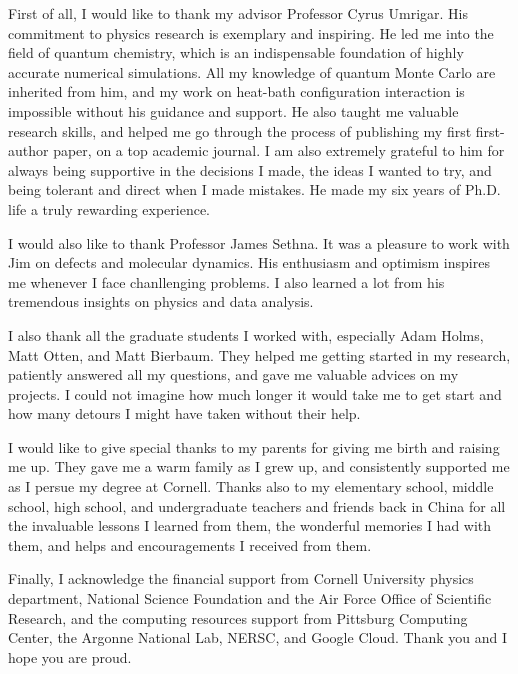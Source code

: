 \documentclass[phd,tocprelim]{cornell}
\begin{document}
\begin{acknowledgements}
First of all, I would like to thank my advisor Professor Cyrus Umrigar.
His commitment to physics research is exemplary and inspiring.
He led me into the field of quantum chemistry, which is an indispensable foundation of highly accurate numerical simulations.
All my knowledge of quantum Monte Carlo are inherited from him, and my work on heat-bath configuration interaction is impossible without his guidance and support.
He also taught me valuable research skills, and helped me go through the process of publishing my first first-author paper, on a top academic journal.
I am also extremely grateful to him for always being supportive in the decisions I made, the ideas I wanted to try, and being tolerant and direct when I made mistakes.
He made my six years of Ph.D. life a truly rewarding experience.

I would also like to thank Professor James Sethna.
It was a pleasure to work with Jim on defects and molecular dynamics.
His enthusiasm and optimism inspires me whenever I face chanllenging problems.
I also learned a lot from his tremendous insights on physics and data analysis.

I also thank all the graduate students I worked with, especially Adam Holms, Matt Otten, and Matt Bierbaum.
They helped me getting started in my research, patiently answered all my questions, and gave me valuable advices on my projects.
I could not imagine how much longer it would take me to get start and how many detours I might have taken without their help.

I would like to give special thanks to my parents for giving me birth and raising me up.
They gave me a warm family as I grew up, and consistently supported me as I persue my degree at Cornell.
Thanks also to my elementary school, middle school, high school, and undergraduate teachers and friends back in China for all the invaluable lessons I learned from them, the wonderful memories I had with them, and helps and encouragements I received from them.

Finally, I acknowledge the financial support from Cornell University physics department, National Science Foundation and the Air Force Office of Scientific Research, and the computing resources support from Pittsburg Computing Center, the Argonne National Lab, NERSC, and Google Cloud.
Thank you and I hope you are proud.
\end{acknowledgements}

\contentspage
\tablelistpage
\figurelistpage
\end{document}
